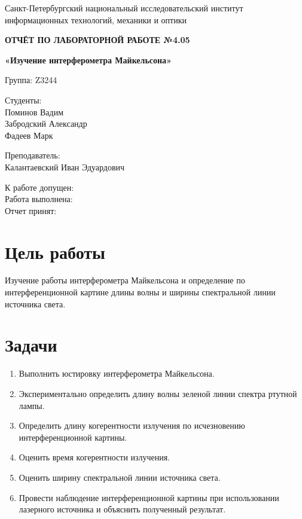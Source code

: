 \documentclass[12pt,a4paper]{article}
\begin{document}
\begin{titlepage}
\begin{center}
Санкт-Петербургский национальный исследовательский институт\\
информационных технологий, механики и оптики

\vspace{3cm}

{\Large\bfseries ОТЧЁТ ПО ЛАБОРАТОРНОЙ РАБОТЕ №4.05}

\vspace{0.5cm}

{\large\bfseries «Изучение интерферометра Майкельсона»}

\vspace{2.5cm}
\end{center}

\begin{flushleft}
Группа: Z3244

Студенты:\\
Поминов Вадим\\
Забродский Александр\\
Фадеев Марк

Преподаватель:\\
Калантаевский Иван Эдуардович
\end{flushleft}

\vfill

\begin{flushleft}
К работе допущен:\\[0.4cm]
Работа выполнена:\\[0.4cm]
Отчет принят:
\end{flushleft}

\end{titlepage}

\section{Цель работы}

Изучение работы интерферометра Майкельсона и определение по интерференционной картине длины волны и ширины спектральной линии источника света.

\section{Задачи}

\begin{enumerate}
    \item Выполнить юстировку интерферометра Майкельсона.
    \item Экспериментально определить длину волны зеленой линии спектра ртутной лампы.
    \item Определить длину когерентности излучения по исчезновению интерференционной картины.
    \item Оценить время когерентности излучения.
    \item Оценить ширину спектральной линии источника света.
    \item Провести наблюдение интерференционной картины при использовании лазерного источника и объяснить полученный результат.
\end{enumerate}
\end{document}
